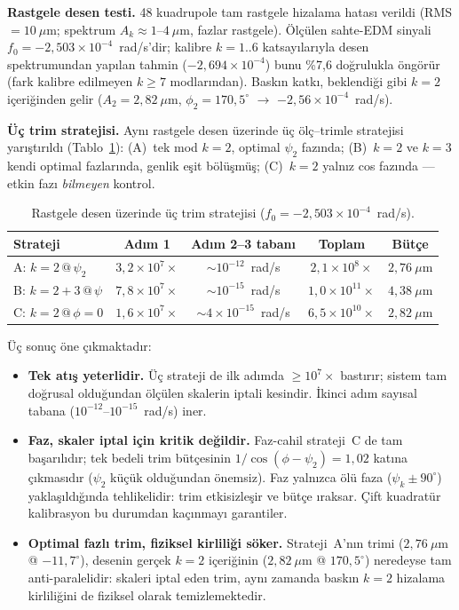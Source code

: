 \documentclass[preprint,12pt]{elsarticle}
\begin{document}
\textbf{Rastgele desen testi.}
48 kuadrupole tam rastgele hizalama hatası verildi (RMS $=10~\mu$m;
spektrum $A_k\approx1$--$4~\mu$m, fazlar rastgele). Ölçülen sahte-EDM
sinyali $f_0=-2{,}503\times10^{-4}$~rad/s'dir; kalibre $k=1..6$
katsayılarıyla desen spektrumundan yapılan tahmin
($-2{,}694\times10^{-4}$) bunu \%7{,}6 doğrulukla öngörür (fark kalibre
edilmeyen $k\ge7$ modlarından). Baskın katkı, beklendiği gibi $k=2$
içeriğinden gelir ($A_2=2{,}82~\mu$m, $\phi_2=170{,}5^\circ$
$\to$ $-2{,}56\times10^{-4}$~rad/s).

\textbf{Üç trim stratejisi.}
Aynı rastgele desen üzerinde üç ölç--trimle stratejisi yarıştırıldı
(Tablo~\ref{tab:trim-faz}): (A)~tek mod $k=2$, optimal $\psi_2$ fazında;
(B)~$k=2$ ve $k=3$ kendi optimal fazlarında, genlik eşit bölüşmüş;
(C)~$k=2$ yalnız cos fazında — etkin fazı \emph{bilmeyen} kontrol.

\begin{table}[h]
\centering
\caption{Rastgele desen üzerinde üç trim stratejisi
($f_0=-2{,}503\times10^{-4}$~rad/s).}
\label{tab:trim-faz}
\begin{tabular}{lcccc}
\toprule
Strateji & Adım 1 & Adım 2--3 tabanı & Toplam & Bütçe \\
\midrule
A: $k{=}2\,@\,\psi_2$       & $3{,}2\times10^{7}\times$ & $\sim\!10^{-12}$~rad/s & $2{,}1\times10^{8}\times$ & $2{,}76~\mu$m \\
B: $k{=}2{+}3\,@\,\psi$     & $7{,}8\times10^{7}\times$ & $\sim\!10^{-15}$~rad/s & $1{,}0\times10^{11}\times$ & $4{,}38~\mu$m \\
C: $k{=}2\,@\,\phi{=}0$     & $1{,}6\times10^{7}\times$ & $\sim\!4\times10^{-15}$~rad/s & $6{,}5\times10^{10}\times$ & $2{,}82~\mu$m \\
\bottomrule
\end{tabular}
\end{table}

Üç sonuç öne çıkmaktadır:
\begin{itemize}
\item \textbf{Tek atış yeterlidir.} Üç strateji de ilk adımda
    $\ge10^{7}\times$ bastırır; sistem tam doğrusal olduğundan ölçülen
    skalerin iptali kesindir. İkinci adım sayısal tabana
    ($10^{-12}$--$10^{-15}$~rad/s) iner.
\item \textbf{Faz, skaler iptal için kritik değildir.} Faz-cahil
    strateji~C de tam başarılıdır; tek bedeli trim bütçesinin
    $1/\cos(\phi-\psi_2)=1{,}02$ katına çıkmasıdır ($\psi_2$ küçük
    olduğundan önemsiz). Faz yalnızca ölü faza ($\psi_k\pm90^\circ$)
    yaklaşıldığında tehlikelidir: trim etkisizleşir ve bütçe ıraksar.
    Çift kuadratür kalibrasyon bu durumdan kaçınmayı garantiler.
\item \textbf{Optimal fazlı trim, fiziksel kirliliği söker.}
    Strateji~A'nın trimi ($2{,}76~\mu$m @ $-11{,}7^\circ$), desenin
    gerçek $k=2$ içeriğinin ($2{,}82~\mu$m @ $170{,}5^\circ$) neredeyse
    tam anti-paralelidir: skaleri iptal eden trim, aynı zamanda baskın
    $k=2$ hizalama kirliliğini de fiziksel olarak temizlemektedir.
\end{itemize}
\end{document}
